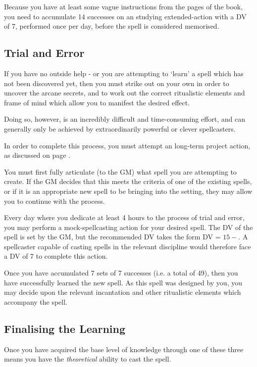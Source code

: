 Because you have at least some vague instructions from the pages of the book, you need to accumulate 14 successes on an studying extended-action with a DV of 7, performed once per day, before the spell is considered memorised. 


\subsection{Trial and Error}

If you have no outside help - or you are attempting to `learn' a spell which has not been discovered yet, then you must strike out on your own in order to uncover the arcane secrets, and to work out the correct ritualistic elements and frame of mind which allow you to manifest the desired effect. 

Doing so, however, is an incredibly difficult and time-consuming effort, and can generally only be achieved by extraordinarily powerful or clever spellcasters. 

In order to complete this process, you must attempt an long-term project action, as discussed on page \pageref{S:Extended}. 

You must first fully articulate (to the GM) what spell you are attempting to create. If the GM decides that this meets the criteria of one of the existing spells, or if it is an appropriate new spell to be bringing into the setting, they may allow you to continue with the process. 

Every day where you dedicate at least 4 hours to the process of trial and error, you may perform a mock-spellcasting action for your desired spell. The DV of the spell is set by the GM, but the recommended DV takes the form DV = $15 - $. A spellcaster capable of casting \levelSeven{} spells in the relevant discipline would therefore face a DV of 7 to complete this action. 

Once you have accumulated 7 sets of 7 successes (i.e. a total of 49), then you have successfully learned the new spell. As this spell was designed by you, you may decide upon the relevant incantation and other ritualistic elements which accompany the spell.  



\subsection{Finalising the Learning}

Once you have acquired the base level of knowledge through one of these three means you have the {\it theoretical} ability to cast the spell. 

